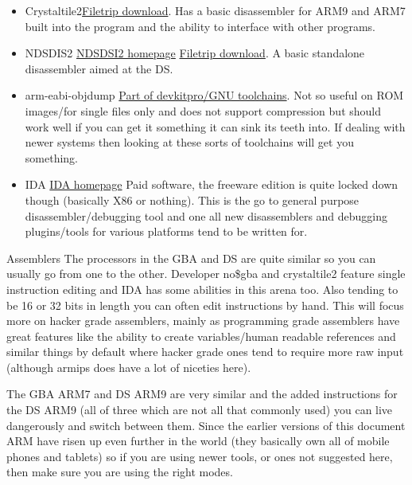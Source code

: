 \documentclass[
]{book}
\providecommand{\tightlist}{%
  \setlength{\itemsep}{0pt}\setlength{\parskip}{0pt}}
\begin{document}
\begin{itemize}
\tightlist
\item
  Crystaltile2\href{http://filetrip.net/f23649-CrystalTile2-2010-09-06.html}{Filetrip download}. Has a basic disassembler for ARM9 and ARM7 built into the program and the ability to interface with other programs.
\item
  NDSDIS2 \href{http://hp.vector.co.jp/authors/VA018359/nds/ndshack.html}{NDSDSI2 homepage} \href{http://filetrip.net/nds-downloads/utilities/download-ndsdis2-223-f28977.html}{Filetrip download}. A basic standalone disassembler aimed at the DS.
\item
  arm-eabi-objdump \href{http://devkitpro.org/}{Part of devkitpro/GNU toolchains}. Not so useful on ROM images/for single files only and does not support compression but should work well if you can get it something it can sink its teeth into. If dealing with newer systems then looking at these sorts of toolchains will get you something.
\item
  IDA \href{http://www.hex-rays.com/products/ida/overview.shtml}{IDA homepage} Paid software, the freeware edition is quite locked down though (basically X86 or nothing). This is the go to general purpose disassembler/debugging tool and one all new disassemblers and debugging plugins/tools for various platforms tend to be written for.
\end{itemize}

Assemblers The processors in the GBA and DS are quite similar so you can usually go from one to the other. Developer no\$gba and crystaltile2 feature single instruction editing and IDA has some abilities in this arena too. Also tending to be 16 or 32 bits in length you can often edit instructions by hand. This will focus more on hacker grade assemblers, mainly as programming grade assemblers have great features like the ability to create variables/human readable references and similar things by default where hacker grade ones tend to require more raw input (although armips does have a lot of niceties here).

The GBA ARM7 and DS ARM9 are very similar and the added instructions for the DS ARM9 (all of three which are not all that commonly used) you can live dangerously and switch between them. Since the earlier versions of this document ARM have risen up even further in the world (they basically own all of mobile phones and tablets) so if you are using newer tools, or ones not suggested here, then make sure you are using the right modes.
\end{document}
